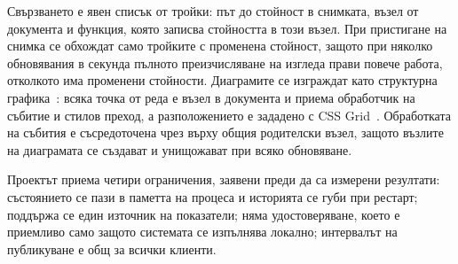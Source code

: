 Свързването е явен списък от тройки: път до стойност в снимката, възел от документа и
функция, която записва стойността в този възел. При пристигане на снимка се обхождат само
тройките с променена стойност, защото при няколко обновявания в секунда пълното преизчисляване
на изгледа прави повече работа, отколкото има променени стойности. Диаграмите се изграждат като
структурна графика~\cite{svg2}: всяка точка от реда е възел в документа и приема обработчик на
събитие и стилов преход, а разположението е зададено с CSS Grid~\cite{css_grid1}. Обработката
на събития е съсредоточена чрез  върху общия родителски възел, защото възлите
на диаграмата се създават и унищожават при всяко обновяване.

Проектът приема четири ограничения, заявени преди да са измерени резултати: състоянието се пази
в паметта на процеса и историята се губи при рестарт; поддържа се един източник на показатели;
няма удостоверяване, което е приемливо само защото системата се изпълнява локално; интервалът
на публикуване е общ за всички клиенти.
